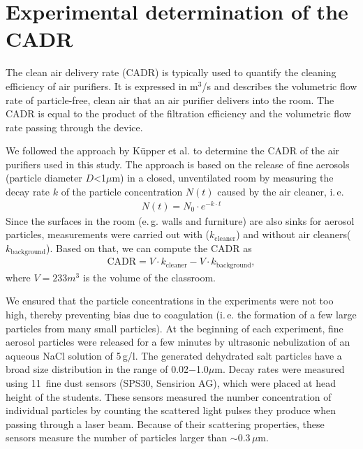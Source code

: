 \documentclass[fleqn,11pt]{wlscirep_supp}
\newcommand\ie{i.\,e.\xspace}
\newcommand\eg{e.\,g.\xspace}
\begin{document}
\listoftables


\newpage

\section{Experimental determination of the CADR}\label{sec:cadr}

The clean air delivery rate (CADR) is typically used to quantify the cleaning efficiency of air purifiers\cite{Nelson1993IndoorEnv}. It is expressed in m$^3$/s and describes the volumetric flow rate of particle-free, clean air that an air purifier delivers into the room. The CADR is equal to the product of the filtration efficiency and the volumetric flow rate passing through the device.

We followed the approach by K\"{u}pper et al.\cite{Kuepper20199AAQR} to determine the CADR of the air purifiers used in this study. The approach is based on the release of fine aerosols (particle diameter $D$<1$\mu$m) in a closed, unventilated room by measuring the decay rate $k$ of the particle concentration $N(t)$ caused by the air cleaner, \ie
\begin{align}
    N(t) = N_0 \cdot e^{-k\cdot t}
\end{align}
Since the surfaces in the room (\eg walls and furniture) are also sinks for aerosol particles, measurements were carried out with ($k_\mathrm{cleaner}$) and without air cleaners($k_\mathrm{background}$). Based on that, we can compute the CADR as
\begin{align}
    \mathrm{CADR} = V \cdot k_\mathrm{cleaner} - V \cdot k_\mathrm{background},
\end{align}
where $V = 233 m^3$ is the volume of the classroom.

We ensured that the particle concentrations in the experiments were not too high, thereby preventing bias due to coagulation (\ie the formation of a few large particles from many small particles). At the beginning of each experiment, fine aerosol particles were released for a few minutes by ultrasonic nebulization of an aqueous NaCl solution of 5\,g/l. The generated dehydrated salt particles have a broad size distribution in the range of 0.02$-$1.0$\mu$m. Decay rates were measured using 11~fine dust sensors (SPS30, Sensirion AG), which were placed at head height of the students. These sensors measured the number concentration of individual particles by counting the scattered light pulses they produce when passing through a laser beam. Because of their scattering properties, these sensors measure the number of particles larger than $\sim$0.3\,$\mu$m.
\end{document}
